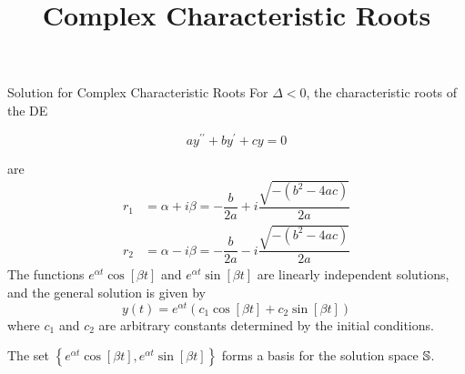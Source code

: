 \documentclass{beamer}
\title[MATH 2250 - Section 4.3]{Complex Characteristic Roots}
\begin{document}
\begin{frame}
  \titlepage
\end{frame}

\begin{frame}
\begin{block}{Solution for Complex Characteristic Roots}
For $\Delta<0$, the characteristic roots of the DE

\vspace{-4mm}
\begin{equation*}
ay^{\prime\prime}+by^{\prime}+cy=0
\end{equation*}

\vspace{-5mm}
are
\begin{equation*}
\begin{aligned}
r_1&=\alpha+i\beta = -\dfrac{b}{2a}+i\dfrac{\sqrt{-(b^2-4ac)}}{2a}\\
r_2&=\alpha-i\beta = -\dfrac{b}{2a}-i\dfrac{\sqrt{-(b^2-4ac)}}{2a}
\end{aligned}
\end{equation*}\pause
The functions $e^{\alpha t}\cos[\beta t]$ and $e^{\alpha t}\sin[\beta t]$ are linearly independent solutions, and the general solution is given by
\begin{equation*}
y(t)=e^{\alpha t}\left(c_1\cos[\beta t]+c_2\sin[\beta t]\right)
\end{equation*}
where $c_1$ and $c_2$ are arbitrary constants determined by the initial conditions.\pause

\vspace{2mm}
The set $\left\{e^{\alpha t}\cos[\beta t],e^{\alpha t}\sin[\beta t]\right\}$ forms a basis for the solution space $\mathbb{S}$.
\end{block}
\end{frame}
\end{document}
